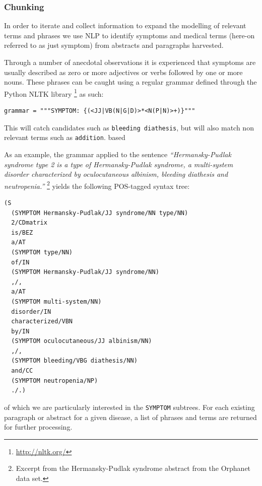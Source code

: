 \documentclass[10pt,letterpaper,final]{article}
\begin{document}
\subsubsection{Chunking}
In order to iterate and collect information to expand the modelling of
relevant terms and phrases we use NLP to identify symptoms and medical
terms (here-on referred to as just symptom) from abstracts and
paragraphs harvested. 



Through a number of anecdotal observations it is experienced that
symptoms are usually described as zero or more adjectives or verbs
followed by one or more nouns. These phrases can be caught using a
regular grammar defined through the Python NLTK library
\footnote{\url{http://nltk.org/}} as such:
\begin{lstlisting}
grammar = """SYMPTOM: {(<JJ|VB(N|G|D)>*<N(P|N)>+)}"""
\end{lstlisting}
This will catch candidates such as \texttt{bleeding diathesis}, but will
also match non relevant terms such as \texttt{addition}.
 based

As an example, the grammar applied to the sentence
\textit{``Hermansky-Pudlak syndrome type 2 is a type of Hermansky-Pudlak
syndrome, a multi-system disorder characterized by oculocutaneous
albinism, bleeding diathesis and neutropenia.''} \footnote{Excerpt from
the Hermansky-Pudlak syndrome abstract from the Orphanet data set.}
yields the following POS-tagged syntax tree:
\begin{lstlisting}
(S
  (SYMPTOM Hermansky-Pudlak/JJ syndrome/NN type/NN)
  2/CDmatrix
  is/BEZ
  a/AT
  (SYMPTOM type/NN)
  of/IN
  (SYMPTOM Hermansky-Pudlak/JJ syndrome/NN)
  ,/,
  a/AT
  (SYMPTOM multi-system/NN)
  disorder/IN
  characterized/VBN
  by/IN
  (SYMPTOM oculocutaneous/JJ albinism/NN)
  ,/,
  (SYMPTOM bleeding/VBG diathesis/NN)
  and/CC
  (SYMPTOM neutropenia/NP)
  ./.)
\end{lstlisting}
of which we are particularly interested in the \texttt{SYMPTOM}
subtrees. For each existing paragraph or abstract for a given disease, a
list of phrases and terms are returned for further processing.
\end{document}

